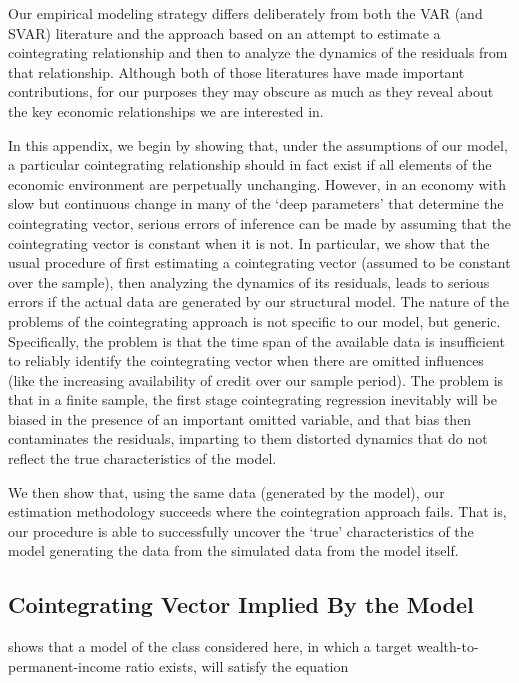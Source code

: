 
Our empirical modeling strategy differs deliberately from both the VAR
(and SVAR) literature and the approach based on an attempt to estimate
a cointegrating relationship and then to analyze the dynamics of the residuals
from that relationship.  Although both of those literatures have made important
contributions, for our purposes they may obscure as much as they reveal
about the key economic relationships we are interested in.

In this appendix, we begin by showing that, under the assumptions of our model,
a particular cointegrating relationship should in fact exist if all elements of
the economic environment are perpetually unchanging.  However, in an economy
with slow but continuous change in many of the `deep parameters' that determine
the cointegrating vector, serious errors of inference can be made by assuming that
the cointegrating vector is constant when it is not.  In particular, we show that
the usual procedure of first estimating a cointegrating vector (assumed to be constant
over the sample), then analyzing the dynamics of its residuals, leads to serious errors
if the actual data are generated by our structural model.  The nature of the problems
of the cointegrating approach is not specific to our model, but generic.  Specifically,
the problem is that the time span of the available data is insufficient to reliably
identify the cointegrating vector when there are omitted influences (like the
increasing availability of credit over our sample period).  The problem is that in a
finite sample, the first stage cointegrating regression inevitably will be biased
in the presence of an important omitted variable, and that bias then contaminates
the residuals, imparting to them distorted dynamics that do not reflect the true
characteristics of the model.

We then show that, using the same data (generated by the model), our estimation methodology
succeeds where the cointegration approach fails.  That is, our procedure is able to
successfully uncover the `true' characteristics of the model generating the data
from the simulated data from the model itself.

\subsection{Cointegrating Vector Implied By the Model}

\cite{carroll:brookings} shows that a model of the class considered here, in which a
target wealth-to-permanent-income ratio exists, will satisfy the equation

